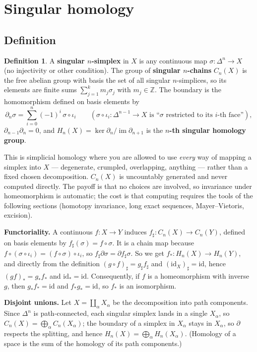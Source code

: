 \documentclass[11pt]{article}
\newcommand{\Z}{\mathbb Z}
\newcommand{\im}{\operatorname{im}}
\theoremstyle{definition}
\newtheorem{defn}[thm]{Definition}
\begin{document}
\section{Singular homology}

\subsection{Definition}
\begin{defn}
A \textbf{singular $n$-simplex} in $X$ is any continuous map $\sigma:\Delta^n\to X$ (no injectivity or other condition). The group of \textbf{singular $n$-chains} $C_n(X)$ is the free abelian group with basis the set of all singular $n$-simplices, so its elements are finite sums $\sum_{j=1}^k m_j\sigma_j$ with $m_j\in\Z$. The boundary is the homomorphism defined on basis elements by
\[\partial_n\sigma=\sum_{i=0}^n(-1)^i\,\sigma\circ\iota_i\qquad(\sigma\circ\iota_i:\Delta^{n-1}\to X\text{ is ``$\sigma$ restricted to its $i$-th face''}),\]
$\partial_{n-1}\partial_n=0$, and $H_n(X)=\ker\partial_n/\im\partial_{n+1}$ is the \textbf{$n$-th singular homology group}.
\end{defn}
\begin{intuition}
This is simplicial homology where you are allowed to use \emph{every} way of mapping a simplex into $X$ --- degenerate, crumpled, overlapping, anything --- rather than a fixed chosen decomposition. $C_n(X)$ is uncountably generated and never computed directly. The payoff is that no choices are involved, so invariance under homeomorphism is automatic; the cost is that computing requires the tools of the following sections (homotopy invariance, long exact sequences, Mayer--Vietoris, excision).
\end{intuition}

\textbf{Functoriality.} A continuous $f:X\to Y$ induces $f_\sharp:C_n(X)\to C_n(Y)$, defined on basis elements by $f_\sharp(\sigma)=f\circ\sigma$. It is a chain map because $f\circ(\sigma\circ\iota_i)=(f\circ\sigma)\circ\iota_i$, so $f_\sharp\partial\sigma=\partial f_\sharp\sigma$. So we get $f_*:H_n(X)\to H_n(Y)$, and directly from the definition $(g\circ f)_\sharp=g_\sharp f_\sharp$ and $(\mathrm{id}_X)_\sharp=\mathrm{id}$, hence $(gf)_*=g_*f_*$ and $\mathrm{id}_*=\mathrm{id}$. Consequently, if $f$ is a homeomorphism with inverse $g$, then $g_*f_*=\mathrm{id}$ and $f_*g_*=\mathrm{id}$, so $f_*$ is an isomorphism.

\textbf{Disjoint unions.} Let $X=\coprod_\alpha X_\alpha$ be the decomposition into path components. Since $\Delta^n$ is path-connected, each singular simplex lands in a single $X_\alpha$, so $C_n(X)=\bigoplus_\alpha C_n(X_\alpha)$; the boundary of a simplex in $X_\alpha$ stays in $X_\alpha$, so $\partial$ respects the splitting, and hence $H_n(X)=\bigoplus_\alpha H_n(X_\alpha)$. (Homology of a space is the sum of the homology of its path components.)
\end{document}
